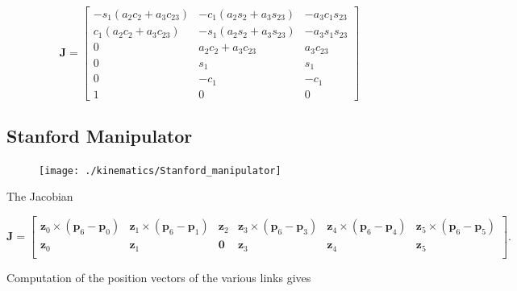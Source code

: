 \documentclass[10pt]{article}
\begin{document}
$$
\boldsymbol{J}=\left[\begin{array}{ccc}
-s_{1}\left(a_{2} c_{2}+a_{3} c_{23}\right) & -c_{1}\left(a_{2} s_{2}+a_{3} s_{23}\right) & -a_{3} c_{1} s_{23} \\
c_{1}\left(a_{2} c_{2}+a_{3} c_{23}\right) & -s_{1}\left(a_{2} s_{2}+a_{3} s_{23}\right) & -a_{3} s_{1} s_{23} \\
0 & a_{2} c_{2}+a_{3} c_{23} & a_{3} c_{23} \\
0 & s_{1} & s_{1} \\
0 & -c_{1} & -c_{1} \\
1 & 0 & 0
\end{array}\right]
$$



\subsection{Stanford Manipulator}


\begin{figure}[H]
    \centering
    \texttt{[image: ./kinematics/Stanford\_manipulator]}
    \label{c1.l2.fig.Stanford}
\end{figure}


The Jacobian

$$
\boldsymbol{J}=\left[\begin{array}{cccccc}
\boldsymbol{z}_{0} \times\left(\boldsymbol{p}_{6}-\boldsymbol{p}_{0}\right) & \boldsymbol{z}_{1} \times\left(\boldsymbol{p}_{6}-\boldsymbol{p}_{1}\right) & \boldsymbol{z}_{2} &
\boldsymbol{z}_{3} \times\left(\boldsymbol{p}_{6}-\boldsymbol{p}_{3}\right) & \boldsymbol{z}_{4} \times\left(\boldsymbol{p}_{6}-\boldsymbol{p}_{4}\right) & \boldsymbol{z}_{5} \times\left(\boldsymbol{p}_{6}-\boldsymbol{p}_{5}\right)\\
\boldsymbol{z}_{0} & \boldsymbol{z}_{1} & \mathbf{0} & \boldsymbol{z}_{3} & \boldsymbol{z}_{4} & \boldsymbol{z}_{5} \\
\end{array}\right] .
$$

Computation of the position vectors of the various links gives
\end{document}
